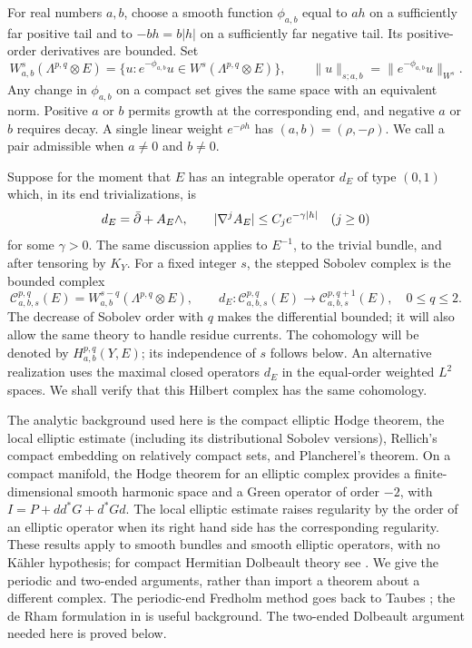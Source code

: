 For real numbers $a,b$, choose a smooth function $\phi_{a,b}$ equal to
$ah$ on a sufficiently far positive tail and to $-bh=b|h|$ on a
sufficiently far negative tail. Its positive-order derivatives are
bounded. Set
\begin{equation}\label{weighted:norm}
 W^s_{a,b}(\Lambda^{p,q}\otimes E)
 =\{u:e^{-\phi_{a,b}}u\in W^s(\Lambda^{p,q}\otimes E)\},
 \qquad
 \|u\|_{s;a,b}=\|e^{-\phi_{a,b}}u\|_{W^s}.
\end{equation}
Any change in $\phi_{a,b}$ on a compact set gives the same space with an
equivalent norm. Positive $a$ or $b$ permits growth at the corresponding
end, and negative $a$ or $b$ requires decay. A single linear weight
$e^{-\rho h}$ has $(a,b)=(\rho,-\rho)$. We call a pair admissible when
$a\ne0$ and $b\ne0$.

Suppose for the moment that $E$ has an integrable operator $d_E$ of type
$(0,1)$ which, in its end trivializations, is
\begin{equation}\label{weighted:end-error}
 d_E=\bar\partial+A_E\wedge,
 \qquad |\nabla^j A_E|\le C_j e^{-\gamma |h|}
 \quad(j\ge0)
\end{equation}
for some $\gamma>0$. The same discussion applies to $E^{-1}$, to the
trivial bundle, and after tensoring by $K_Y$. For a fixed integer $s$,
the stepped Sobolev complex is the bounded complex
\begin{equation}\label{weighted:stepped}
 \mathcal C^{p,q}_{a,b,s}(E)=
 W^{s-q}_{a,b}(\Lambda^{p,q}\otimes E),
 \qquad d_E:\mathcal C^{p,q}_{a,b,s}(E)
       \longrightarrow\mathcal C^{p,q+1}_{a,b,s}(E),
 \quad 0\le q\le2.
\end{equation}
The decrease of Sobolev order with $q$ makes the differential bounded;
it will also allow the same theory to handle residue currents.
The cohomology will be denoted by $H^{p,q}_{a,b}(Y,E)$; its independence
of $s$ follows below. An alternative realization uses the maximal closed
operators $d_E$ in the equal-order weighted $L^2$ spaces. We shall verify
that this Hilbert complex has the same cohomology.

The analytic background used here is the compact elliptic Hodge theorem,
the local elliptic estimate (including its distributional Sobolev
versions), Rellich's compact embedding on relatively compact sets, and
Plancherel's theorem. On a compact manifold, the Hodge theorem for an
elliptic complex provides a finite-dimensional smooth harmonic space and
a Green operator of order $-2$, with
$I=P+d d^*G+d^*Gd$. The local elliptic estimate raises regularity by the
order of an elliptic operator when its right hand side has the
corresponding regularity. These results apply to smooth bundles and
smooth elliptic operators, with no K\"ahler hypothesis; for compact
Hermitian Dolbeault theory see
\cite[Chapter~VI, Theorems~(7.1)--(7.2)]{Demailly2012}. We give the
periodic and two-ended arguments, rather than import a theorem about a
different complex. The periodic-end Fredholm method goes back to Taubes
\cite[Lemma~4.3]{Taubes1987}; the de Rham formulation in
\cite[Proposition~2.1]{MRS2014} is useful background. The two-ended
Dolbeault argument needed here is proved below.

